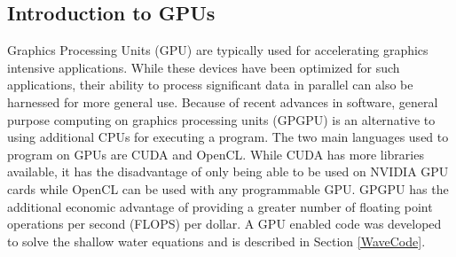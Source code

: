 \subsection{Introduction to GPUs}
\label{GPU}
Graphics Processing Units (GPU) are typically used for accelerating graphics intensive applications. While these devices have been optimized for such applications, their ability to process significant data in parallel can also be harnessed for more general use. Because of recent advances in software, general purpose computing on graphics processing units (GPGPU) is an alternative to using additional CPUs for executing a program. The two main languages used to program on GPUs are CUDA and OpenCL. While CUDA has more libraries available, it has the disadvantage of only being able to be used on NVIDIA GPU cards while OpenCL can be used with any programmable GPU. GPGPU has the additional economic advantage of providing a greater number of floating point operations per second (FLOPS) per dollar. A GPU enabled code was developed to solve the shallow water equations and is described in Section \ref{WaveCode}.
